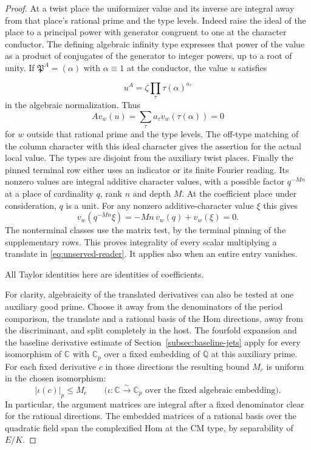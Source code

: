 \begin{proof}
At a twist place the uniformizer value and its inverse
are integral away from that place's rational prime and the type
levels. Indeed raise the ideal of the place to a principal power
with generator congruent to one at the character conductor.
The defining algebraic infinity type expresses that power of
the value as a product of conjugates of the generator to
integer powers, up to a root of unity. If \(\mathfrak P^A=(\alpha)\) with \(\alpha\equiv1\)
at the conductor, the value \(u\) satisfies

\[
  u^A=\zeta\prod_\tau\tau(\alpha)^{a_\tau}
\]
in the algebraic normalization. Thus
\[
       A v_w(u)=\sum_\tau a_\tau v_w(\tau(\alpha))=0
\]
for \(w\) outside that rational prime and the type levels. The off-type matching of the
column character with this ideal character gives the assertion
for the actual local value. The types are disjoint from the
auxiliary twist places. Finally the pinned terminal row either
uses an indicator or its finite Fourier reading. Its nonzero
values are integral additive character values, with a possible
factor \(q^{-Mn}\) at a place of cardinality \(q\), rank \(n\)
and depth \(M\). At the coefficient place under consideration, \(q\) is a unit. For any nonzero additive-character value \(\xi\) this gives
\[
  v_w(q^{-Mn}\xi)=-Mn\,v_w(q)+v_w(\xi)=0.
\]
 The
nonterminal classes use the matrix test, by the terminal pinning
of the supplementary rows. This proves integrality of every
scalar multiplying a translate in \eqref{eq:unserved-reader}.
It applies also when an entire entry vanishes.
\label{cor:unserved-kernel-charts-1}

All Taylor identities here are identities of coefficients.

For clarity, algebraicity of the translated derivatives can
also be tested at one auxiliary good prime. Choose it away from
the denominators of the period comparison, the translate and a
rational basis of the Hom directions, away from the discriminant,
and split completely in the host. The fourfold expansion and the
baseline derivative estimate of Section~\ref{subsec:baseline-jets}
apply for every isomorphism of \(\mathbb C\) with \(\mathbb C_p\)
over a fixed embedding of \(\overline{\mathbb Q}\) at this auxiliary
prime. For each fixed derivative \(c\) in those directions the resulting bound \(M_c\) is uniform in the chosen isomorphism:
\[
  |\iota(c)|_p\le M_c\qquad\bigl(\iota:\mathbb C\xrightarrow{\sim}\mathbb C_p\text{ over the fixed algebraic embedding}\bigr).
\]
 In particular, the argument matrices are
integral after a fixed denominator clear for the rational
directions. The embedded matrices of a rational basis over the
quadratic field span the complexified Hom at the CM type, by
separability of \(E/K\).


\end{proof}
